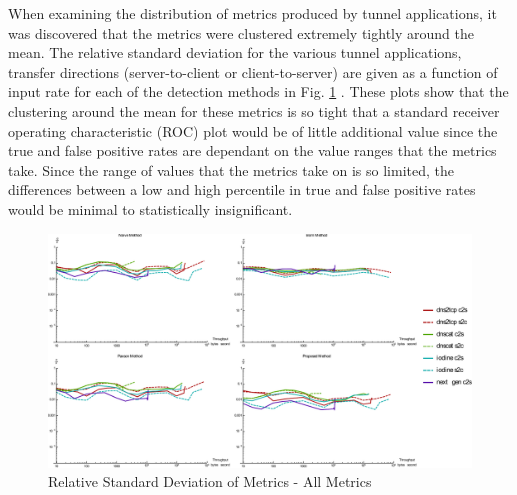 \documentclass{llncs}
\begin{document}
When examining the distribution of metrics produced by tunnel applications, it
was discovered that the metrics were clustered extremely tightly around the
mean. The relative standard deviation for the various tunnel applications,
transfer directions (server-to-client or client-to-server) are given as a
function of input rate for each of the detection methods in
Fig. \ref{rsd-all}
. These
plots show that the clustering around the mean for these metrics is so tight
that a standard receiver operating characteristic (ROC) plot would be of little
additional value since the true and false positive rates are dependant on the
value ranges that the metrics take. Since the range of values that the metrics
take on is so limited, the differences between a low and high percentile in true
and false positive rates would be minimal to statistically insignificant.

\begin{figure}
\centering
\includegraphics[width=\textwidth]{../figures/rsd-all.pdf}
\caption[Relative Standard Deviation of Metrics - All Metrics]{Relative Standard Deviation of Metrics - All Metrics}
\label{rsd-all}
\end{figure}

%
%
%
\end{document}
